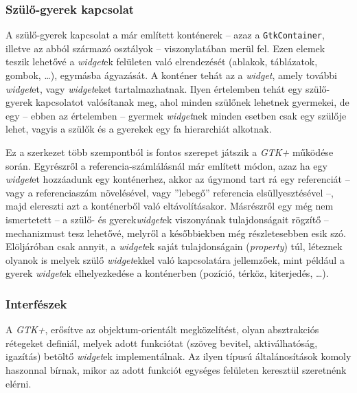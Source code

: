 \subsubsection{Szülő-gyerek kapcsolat}

A szülő-gyerek kapcsolat a már említett konténerek -- azaz a \texttt{GtkContainer}, illetve az abból származó osztályok -- viszonylatában merül fel. Ezen elemek teszik lehetővé a \textit{widget}ek felületen való elrendezését (ablakok, táblázatok, gombok, \dots), egymásba ágyazását. A konténer tehát az a \textit{widget}, amely további \textit{widget}et, vagy \textit{widget}eket tartalmazhatnak. Ilyen értelemben tehát egy szülő-gyerek kapcsolatot valósítanak meg, ahol minden szülőnek lehetnek gyermekei, de egy -- ebben az értelemben -- gyermek \textit{widget}nek minden esetben csak egy szülője lehet, vagyis a szülők és a gyerekek egy fa hierarchiát alkotnak.

Ez a szerkezet több szempontból is fontos szerepet játszik a \textit{GTK+} működése során. Egyrészről a referencia-számlálásnál már említett módon, azaz ha egy \textit{widget}et hozzáadunk egy konténerhez, akkor az úgymond tart rá egy referenciát -- vagy a referenciaszám növelésével, vagy ''lebegő'' referencia elsüllyesztésével --, majd elereszti azt a konténerből való eltávolításakor. Másrészről egy még nem ismertetett -- a szülő- és gyerek\textit{widget}ek viszonyának tulajdonságait rögzítő -- mechanizmust tesz lehetővé, melyről a későbbiekben még részletesebben esik szó. Elöljáróban csak annyit, a \textit{widget}ek saját tulajdonságain (\textit{property}) túl, léteznek olyanok is melyek szülő \textit{widget}ekkel való kapcsolatára jellemzőek, mint például a gyerek \textit{widget}ek elhelyezkedése a konténerben (pozíció, térköz, kiterjedés, \dots).

\subsubsection{Interfészek}

A \textit{GTK+}, erősítve az objektum-orientált megközelítést, olyan absztrakciós rétegeket definiál, melyek adott funkciótat (szöveg bevitel, aktiválhatóság, igazítás) betöltő \textit{widget}ek implementálnak. Az ilyen típusú általánosítások komoly haszonnal bírnak, mikor az adott funkciót egységes felületen keresztül szeretnénk elérni.


